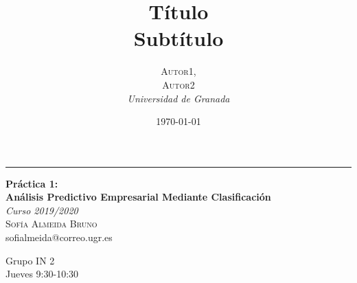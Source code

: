 \documentclass[a4paper, 17pt]{article}
\title{\textbf{Título}\\ %
Subtítulo} %
\author{\textsc{Autor1,\\Autor2} %
\\{\textit{Universidad de Granada}}} %
\date{\today} %
\begin{document}

\begin{titlepage} %
	
	\raggedleft %
	
	\rule{1pt}{\textheight} %
	\hspace{0.05\textwidth} %
	\parbox[b]{0.75\textwidth}{ %
		
		{\Huge\bfseries Práctica 1:\\[0.5\baselineskip] Análisis Predictivo Empresarial Mediante Clasificación}\\[2\baselineskip] %
		{\large\textit{Curso 2019/2020}}\\[4\baselineskip] %
		{\Large\textsc{Sofía Almeida Bruno}\\[0.5\baselineskip]sofialmeida@correo.ugr.es} %
		
		\vspace{0.4\textheight} %
		
		{\noindent Grupo IN 2\\[0.5\baselineskip] Jueves 9:30-10:30}\\[\baselineskip] %
	}

\end{titlepage}




{\parskip=2pt
  \tableofcontents
}
\pagebreak
\end{document}
